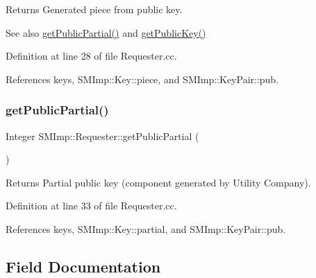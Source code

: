 \begin{DoxyReturn}{Returns}
Generated piece from public key. 
\end{DoxyReturn}
\begin{DoxySeeAlso}{See also}
\hyperlink{classSMImp_1_1Requester_a1aaa8a7e923b59ddf07b97d0f68a7fba}{get\+Public\+Partial()} and \hyperlink{classSMImp_1_1Requester_a02db2b7bd3da670640cc382da7100653}{get\+Public\+Key()} 
\end{DoxySeeAlso}


Definition at line 28 of file Requester.\+cc.



References keys, S\+M\+Imp\+::\+Key\+::piece, and S\+M\+Imp\+::\+Key\+Pair\+::pub.

\mbox{\label{classSMImp_1_1Requester_a1aaa8a7e923b59ddf07b97d0f68a7fba}} 
\subsubsection{\texorpdfstring{get\+Public\+Partial()}{getPublicPartial()}}
{\footnotesize\ttfamily Integer S\+M\+Imp\+::\+Requester\+::get\+Public\+Partial (\begin{DoxyParamCaption}{ }\end{DoxyParamCaption})}

\begin{DoxyReturn}{Returns}
Partial public key (component generated by Utility Company). 
\end{DoxyReturn}


Definition at line 33 of file Requester.\+cc.



References keys, S\+M\+Imp\+::\+Key\+::partial, and S\+M\+Imp\+::\+Key\+Pair\+::pub.



\subsection{Field Documentation}
\mbox{\label{classSMImp_1_1Requester_a16911083f2e3fc903ed3e6e7ca2a58b1}} 
